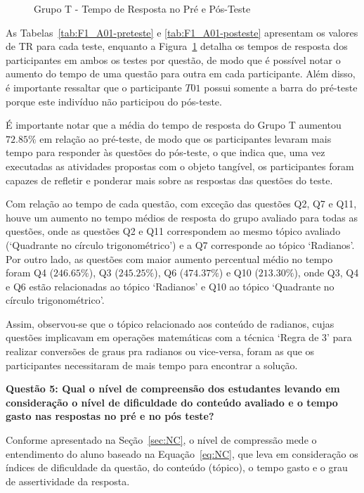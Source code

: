 \begin{figure}[htb]
\begin{tikzpicture}
	\end{tikzpicture}
	\caption{Grupo T - Tempo de Resposta no Pré e Pós-Teste}
	\label{fig:F1_TR_H01_preposteste}
\end{figure}


As Tabelas~\ref{tab:F1_A01-preteste} e \ref{tab:F1_A01-posteste} apresentam os valores de TR para cada teste, enquanto a Figura~\ref{fig:F1_TR_H01_preposteste} detalha os tempos de resposta dos participantes em ambos os testes por questão, de modo que é possível notar o aumento do tempo de uma questão para outra em cada participante. Além disso, é importante ressaltar que o participante $T01$ possui somente a barra do pré-teste porque este indivíduo não participou do pós-teste.

É importante notar que a média do tempo de resposta do Grupo T aumentou $72.85\%$ em relação ao pré-teste, de modo que os participantes levaram mais tempo para responder às questões do pós-teste, o que indica que, uma vez executadas as atividades propostas com o objeto tangível, os participantes foram capazes de refletir e ponderar mais sobre as respostas das questões do teste.

Com relação ao tempo de cada questão, com exceção das questões Q2, Q7 e Q11, houve um aumento no tempo médios de resposta do grupo avaliado para todas as questões, onde as questões Q2 e Q11 correspondem ao mesmo tópico avaliado (`Quadrante no círculo trigonométrico') e a Q7 corresponde ao tópico `Radianos'. Por outro lado, as questões com maior aumento percentual médio no tempo foram Q4 ($246.65\%$), Q3 ($245.25\%$), Q6 ($474.37\%$) e Q10 ($213.30\%$), onde Q3, Q4 e Q6 estão relacionadas ao tópico `Radianos' e Q10 ao tópico `Quadrante no círculo trigonométrico'. 

Assim, observou-se que o tópico relacionado aos conteúdo de radianos, cujas questões implicavam em operações matemáticas com a técnica `Regra de 3' para realizar conversões de graus pra radianos ou vice-versa, foram as que os participantes necessitaram de mais tempo para encontrar a solução.


\textbf{Questão 5: Qual o nível de compreensão dos estudantes levando em consideração o nível de dificuldade do conteúdo avaliado e o tempo gasto nas respostas no pré e no pós teste?}

Conforme apresentado na Seção~\ref{sec:NC}, o nível de compressão mede o entendimento do aluno baseado na Equação~\ref{eq:NC}, que leva em consideração os índices de dificuldade da questão, do conteúdo (tópico), o tempo gasto e o grau de assertividade da resposta.

